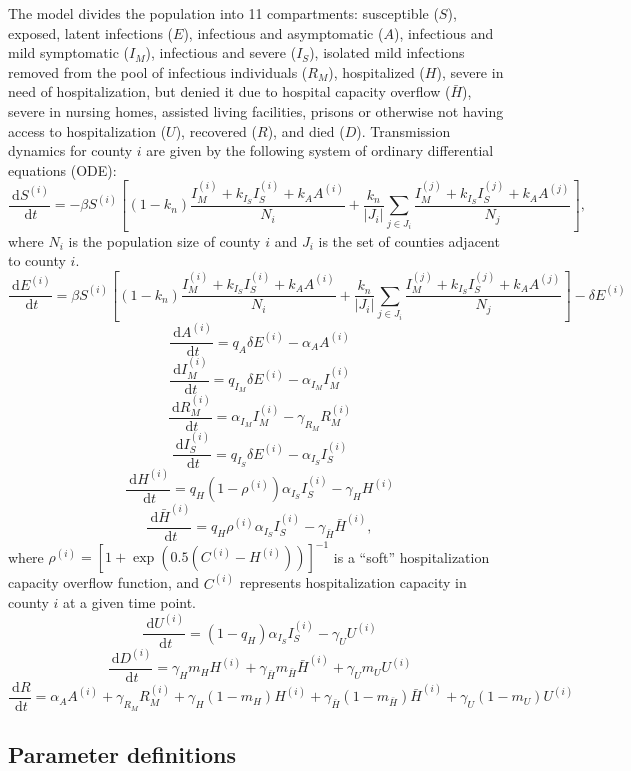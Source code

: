 \documentclass[11pt]{article}
\newcommand{\dx}[1]{\ \text{d} #1}
\begin{document}
The model divides the population into 11 compartments: susceptible ($S$), exposed, latent infections ($E$), infectious and asymptomatic ($A$), infectious and mild symptomatic ($I_M$), infectious and severe ($I_S$), isolated mild infections removed from the pool of infectious individuals ($R_M$), hospitalized ($H$), severe in need of hospitalization, but denied it due to hospital capacity overflow ($\bar{H}$), severe in nursing homes, assisted living facilities, prisons or otherwise not having access to hospitalization ($U$), recovered ($R$), and died ($D$).  Transmission dynamics for county $i$  are given by the following system of ordinary differential equations (ODE): 
\[ \frac{\dx{S^{(i)}}}{\dx{t}} = -\beta S^{(i)} \left[ (1-k_n) \frac{ I_M^{(i)} + k_{I_S} I_S^{(i)} + k_A A^{(i)}}{N_i} + \frac{k_n}{|J_i|} \sum_{j\in J_i}  \frac{I_M^{(j)} + k_{I_S} I_S^{(j)} + k_A A^{(j)}}{N_j} \right], \]
where $N_i$ is the population size of county $i$ and $J_i$ is the set of counties adjacent to county $i$.
\[ \frac{\dx{E^{(i)}}}{\dx{t}} = \beta S^{(i)} \left[ (1-k_n) \frac{ I_M^{(i)} + k_{I_S} I_S^{(i)} + k_A A^{(i)}}{N_i} + \frac{k_n}{|J_i|} \sum_{j\in J_i}  \frac{I_M^{(j)} + k_{I_S} I_S^{(j)} + k_A A^{(j)}}{N_j} \right] - \delta E^{(i)} \]
\[ \frac{\dx{A^{(i)}}}{\dx{t}} = q_A \delta E^{(i)} - \alpha_A A^{(i)} \]
\[ \frac{\dx{I_M^{(i)}}}{\dx{t}} = q_{I_M} \delta E^{(i)} - \alpha_{I_M} I_M^{(i)} \]
\[ \frac{\dx{R_M^{(i)}}}{\dx{t}} = \alpha_{I_M} I_M^{(i)} - \gamma_{R_M} R_M^{(i)} \]
\[ \frac{\dx{I_S^{(i)}}}{\dx{t}} = q_{I_S} \delta E^{(i)} - \alpha_{I_S} I_S^{(i)} \]
\[ \frac{\dx{H^{(i)}}}{\dx{t}} =  q_H (1 - \rho^{(i)}) \alpha_{I_S} I_S^{(i)} - \gamma_H H^{(i)}  \]
\[ \frac{\dx{\bar{H}^{(i)}}}{\dx{t}} =  q_H \rho^{(i)} \alpha_{I_S} I_S^{(i)} - \gamma_{\bar{H}} \bar{H}^{(i)},  \]
where $\rho^{(i)} = \left[ 1+\exp(0.5(C^{(i)}-H^{(i)})) \right]^{-1}$ is a ``soft'' hospitalization capacity overflow function, and $C^{(i)}$ represents hospitalization capacity in county $i$ at a given time point.
\[ \frac{\dx{U^{(i)}}}{\dx{t}} =  (1 - q_H) \alpha_{I_S} I_S^{(i)} - \gamma_{U} U^{(i)}  \]
\[ \frac{\dx{D^{(i)}}}{\dx{t}} = \gamma_H m_H H^{(i)} + \gamma_{\bar{H}}  m_{\bar{H}} \bar{H}^{(i)} + \gamma_{U} m_{U} U^{(i)} \]
\[ \frac{\dx{R}}{\dx{t}} = \alpha_A A^{(i)} + \gamma_{R_M} R_M^{(i)} + \gamma_H (1-m_H) H^{(i)} + \gamma_{\bar{H}} (1 - m_{\bar{H}}) \bar{H}^{(i)} + \gamma_{U} (1- m_{U}) U^{(i)}  \]




\subsection{Parameter definitions}
\end{document}

